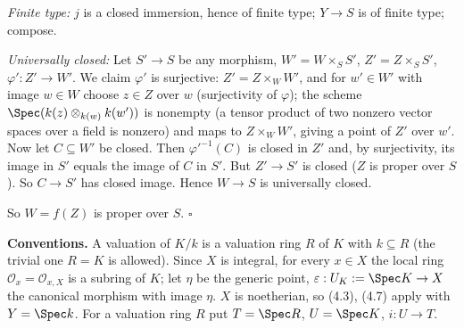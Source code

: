 \documentclass[11pt]{article}
\begin{document}
\emph{Finite type:} $j$ is a closed immersion, hence of finite type; $Y\to S$ is of finite type; compose.

\emph{Universally closed:} Let $S'\to S$ be any morphism, $W'=W\times_SS'$, $Z'=Z\times_SS'$, $\varphi':Z'\to W'$. We claim $\varphi'$ is surjective: $Z'=Z\times_WW'$, and for $w'\in W'$ with image $w\in W$ choose $z\in Z$ over $w$ (surjectivity of $\varphi$); the scheme $\Spec(k(z)\otimes_{k(w)}k(w'))$ is nonempty (a tensor product of two nonzero vector spaces over a field is nonzero) and maps to $Z\times_WW'$, giving a point of $Z'$ over $w'$. Now let $C\subseteq W'$ be closed. Then $\varphi'^{-1}(C)$ is closed in $Z'$ and, by surjectivity, its image in $S'$ equals the image of $C$ in $S'$. But $Z'\to S'$ is closed ($Z$ is proper over $S$). So $C\to S'$ has closed image. Hence $W\to S$ is universally closed.

So $W=f(Z)$ is proper over $S$. \hfill$\square$

\pf
\textbf{Conventions.} A valuation of $K/k$ is a valuation ring $R$ of $K$ with $k\subseteq R$ (the trivial one $R=K$ is allowed). Since $X$ is integral, for every $x\in X$ the local ring $\mathcal O_x=\mathcal O_{x,X}$ is a subring of $K$; let $\eta$ be the generic point, $\varepsilon:U_K:=\Spec K\to X$ the canonical morphism with image $\eta$. $X$ is noetherian, so (4.3), (4.7) apply with $Y=\Spec k$. For a valuation ring $R$ put $T=\Spec R$, $U=\Spec K$, $i:U\to T$.
\end{document}

